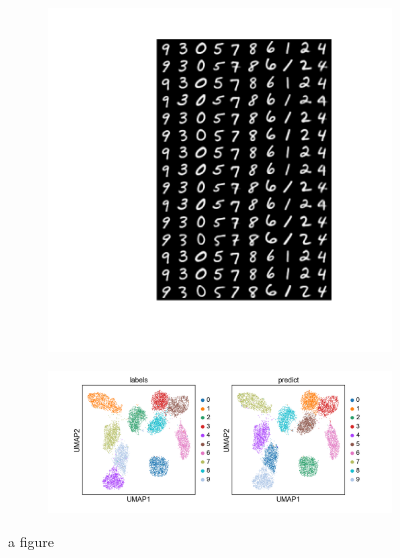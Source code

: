 \documentclass[11pt, a4paper]{report}
\theoremstyle{plain}
\theoremstyle{definition}
\theoremstyle{remark}
\begin{document}
\begin{figure}
\begin{framed}
\centering
\begin{subfigure}[b]{0.4\textwidth}
\includegraphics[width=\textwidth]{images/model_mnist_10c_generation.png}
\caption{}
\end{subfigure}
\begin{subfigure}[b]{0.4\textwidth}
\includegraphics[width=\textwidth]{images/model_mnist_10c_umap.png}
\caption{}
\end{subfigure}
\caption{a figure}
\label{fig:myfig}
\end{framed}
\end{figure}
\end{document}
